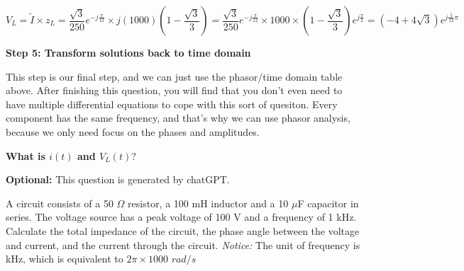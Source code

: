 \begin{enumerate}
{$$V_L=\widetilde{I}{\times}z_L=\frac{\sqrt{3}}{250}e^{-j\frac{\pi}{12}}{\times}j(1000)(1-\frac{\sqrt{3}}{3})=\frac{\sqrt{3}}{250}e^{-j\frac{\pi}{12}}{\times}1000{\times}(1-\frac{\sqrt{3}}{3})e^{j\frac{\pi}{2}}=(-4+4\sqrt{3})e^{j\frac{5}{12}\pi}$$
}

\qitem \textbf{Step 5: Transform solutions back to time domain}

This step is our final step, and we can just use the phasor/time domain table above. After finishing this question, you will find that
you don't even need to have multiple differential equations to cope with this sort of quesiton. Every component has the same frequency, and that's 
why we can use phasor analysis, because we only need focus on the phases and amplitudes. 

\textbf{What is $i(t)$ and $V_{L}(t)$}? 

\ws{\vspace{80px}}


\qitem \textbf{Optional:} This question is generated by chatGPT. 

A circuit consists of a 50 $\Omega$ resistor, a 100 mH inductor and a 10 $\mu$F capacitor in series.
The voltage source has a peak voltage of 100 V and a frequency of 1 kHz. 
Calculate the total impedance of the circuit, the phase angle between the voltage and current, and the current through the circuit.
\textit{Notice:} The unit of frequency is kHz, which is equivalent to $2\pi \times 1000$ $rad/s$

\end{enumerate}
